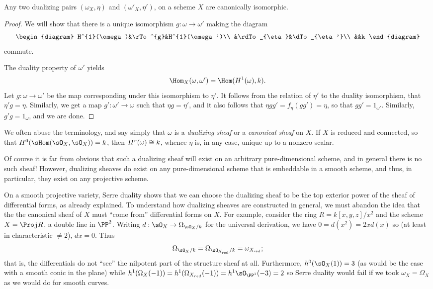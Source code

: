 \begin{proposition} Any two dualizing pairs $(\omega_{X}, \eta)$ and $(\omega'_{X}, \eta')$, on a scheme $X$ are canonically isomorphic.
\end{proposition}

\begin{proof}
We will show that there is a unique isomorphism $g: \omega\to \omega'$ making the diagram
$$
\begin{diagram}
 H^{1}(\omega)&\rTo^{g}&H^{1}(\omega')\\
 &\rdTo_{\eta}&\dTo_{\eta'}\\
 &&k
\end{diagram}
$$
commute. 

 The duality property of $\omega'$ yields
$$
\Hom_{X}(\omega, \omega')  = \Hom(\HH^{1}(\omega), k).
$$
Let $g: \omega \to \omega'$ be the map corresponding under this isomorphism to $\eta'$. It follows from the relation of $\eta'$ to the duality isomorphism, that 
$\eta'g = \eta$. Similarly, we get a map $g':\omega'\to \omega$ such that
$\eta g = \eta'$, and it also follows that $\eta gg' = f_{\eta}(gg') =  \eta$, so that
$gg' = 1_{\omega'}$. Similarly, $g'g = 1_{\omega}$, and we are done.
\end{proof}
 
We often abuse the terminology, and say simply that $\omega$ is a \emph{dualizing sheaf} or a \emph {canonical sheaf} on $X$. If $X$ is reduced and connected, so that $\HH^{0} (\sHom(\sO_{X} , \sO_{X})) = k$, then
${H}^{r}(\omega) \cong k$, whence $\eta$ is, in any case, unique up to a nonzero scalar. 

Of course it is far from obvious that such a dualizing sheaf will exist on an arbitrary pure-dimensional scheme, and in general there is no such sheaf! However, dualizing sheaves do exist on any pure-dimensional scheme that is embeddable in a smooth scheme, and thus, in particular, they exist on any projective scheme.

On a smooth projective variety, Serre duality shows that we can choose the dualizing sheaf to be the top exterior power of the sheaf of differential forms, as already explained. To understand how dualizing sheaves are constructed in general, we must abandon the idea that the the canonical sheaf of $X$ must ``come from'' differential forms on $X$. For example, consider the ring $R = k[x,y,z]/x^{2}$ and the scheme $X = \Proj R$, a double line in $\PP^{2}$. Writing $d: \sO_{X}\to \Omega_{\sO_{X}/k}$ for the universal derivation, we have $0 = d(x^{2}) = 2xd(x)$ so (at least in characteristic $\neq 2$), $dx = 0$. Thus 
\def\red{{\rm red}}
$$
\Omega_{\sO_{X}/k} = \Omega_{\sO_{X_{\red}}/k} = \omega_{X_{\red}};
$$ 
that is, the differentials do not ``see'' the nilpotent part of the structure sheaf at all. Furthermore, 
$
h^{0}(\sO_{X}(1)) = 3
$
(as would be the case with a smooth conic in the plane)
while 
$
h^{1}(\Omega_{X} (-1)) = h^{1}(\Omega_{X_{red}} (-1)) = h^{1}\sO_{\PP^{1}}(-3) = 2
$
so Serre duality would fail if we took $\omega_{X} = \Omega_{X}$ as we would do for smooth curves.

